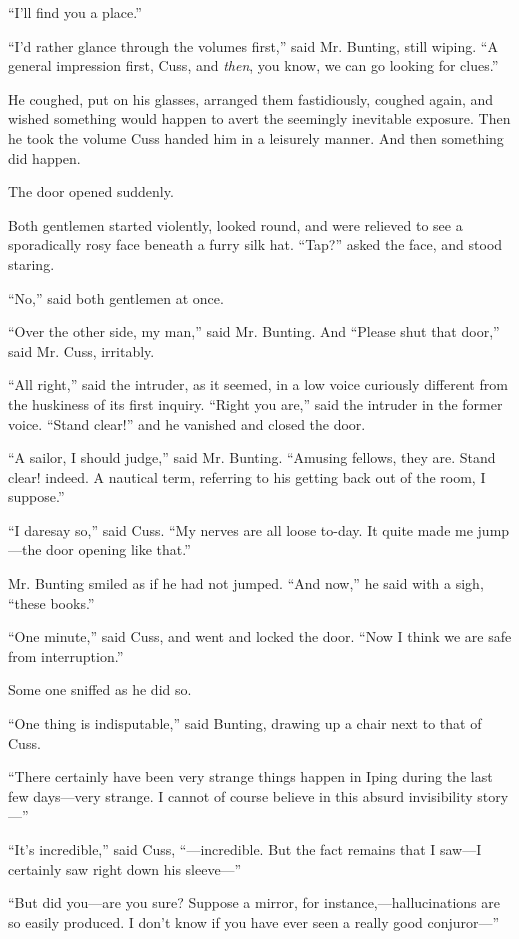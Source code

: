“I’ll find you a place.”

“I’d rather glance through the volumes first,” said Mr. Bunting, still wiping. “A general impression first, Cuss, and \emph{then}, you know, we can go looking for clues.”

He coughed, put on his glasses, arranged them fastidiously, coughed again, and wished something would happen to avert the seemingly inevitable exposure. Then he took the volume Cuss handed him in a leisurely manner. And then something did happen.

The door opened suddenly.

Both gentlemen started violently, looked round, and were relieved to see a sporadically rosy face beneath a furry silk hat. “Tap?” asked the face, and stood staring.

“No,” said both gentlemen at once.

“Over the other side, my man,” said Mr. Bunting. And “Please shut that door,” said Mr. Cuss, irritably.

“All right,” said the intruder, as it seemed, in a low voice curiously different from the huskiness of its first inquiry. “Right you are,” said the intruder in the former voice. “Stand clear!” and he vanished and closed the door.

“A sailor, I should judge,” said Mr. Bunting. “Amusing fellows, they are. Stand clear! indeed. A nautical term, referring to his getting back out of the room, I suppose.”

“I daresay so,” said Cuss. “My nerves are all loose to-day. It quite made me jump—the door opening like that.”

Mr. Bunting smiled as if he had not jumped. “And now,” he said with a sigh, “these books.”

“One minute,” said Cuss, and went and locked the door. “Now I think we are safe from interruption.”

Some one sniffed as he did so.

“One thing is indisputable,” said Bunting, drawing up a chair next to that of Cuss.

“There certainly have been very strange things happen in Iping during the last few days—very strange. I cannot of course believe in this absurd invisibility story—”

“It’s incredible,” said Cuss, “—incredible. But the fact remains that I saw—I certainly saw right down his sleeve—”

“But did you—are you sure? Suppose a mirror, for instance,—hallucinations are so easily produced. I don’t know if you have ever seen a really good conjuror—”

